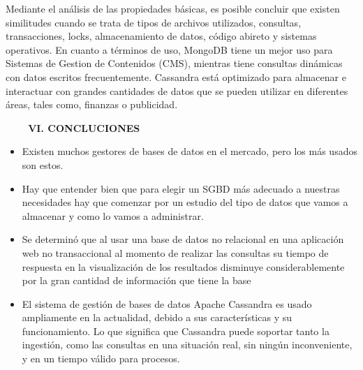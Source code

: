 \documentclass[12pt]{article}
\begin{document}
\begin{multicols}{2}

\par

{\fontsize{9pt}{10.8pt}\selectfont Mediante el análisis de las propiedades básicas, es posible concluir que existen similitudes cuando se trata de tipos de archivos utilizados, consultas, transacciones, locks, almacenamiento de datos, código abireto y sistemas operativos. En cuanto a términos de uso, MongoDB tiene un mejor uso para Sistemas de Gestion de Contenidos (CMS), mientras tiene consultas dinámicas con datos escritos frecuentemente. Cassandra está optimizado para almacenar e interactuar con grandes cantidades de datos que se pueden utilizar en diferentes áreas, tales como, finanzas o publicidad.\par}\par


\vspace{\baselineskip}
\textbf{\ \ \ \  VI. CONCLUCIONES}\par

\begin{itemize}
	\item {\fontsize{9pt}{10.8pt}\selectfont Existen muchos gestores de bases de datos en el mercado, pero los más usados son estos.\par}\par

	\item {\fontsize{9pt}{10.8pt}\selectfont Hay que entender bien que para elegir un SGBD más adecuado a nuestras necesidades hay que comenzar por un estudio del tipo de datos que vamos a almacenar y como lo vamos a administrar.\par}\par

	\item {\fontsize{9pt}{10.8pt}\selectfont Se determinó que al usar una base de datos no relacional en una aplicación web no transaccional al momento de realizar las consultas su tiempo de respuesta en la visualización de los resultados disminuye considerablemente por la gran cantidad de información que tiene la base\par}\par

	\item {\fontsize{9pt}{10.8pt}\selectfont El sistema de gestión de bases de datos Apache Cassandra es usado ampliamente en la actualidad, debido a sus características y su funcionamiento. Lo que significa que Cassandra puede soportar tanto la ingestión, como las consultas en una situación real, sin ningún inconveniente, y en un tiempo válido para procesos.\par}
\end{itemize}\par



\end{multicols}
\end{document}
